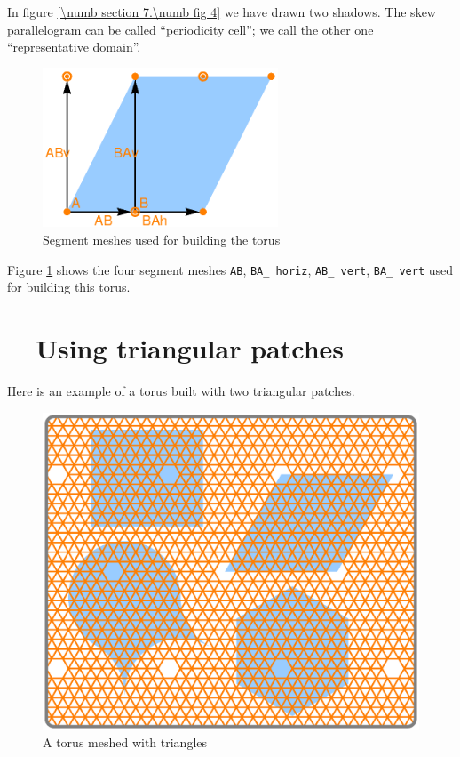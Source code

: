 In figure \ref{\numb section 7.\numb fig 4} we have drawn two shadows.
The skew parallelogram can be called ``periodicity cell'';
we call the other one ``representative domain''.

\begin{figure}[ht] \centering
  \includegraphics[width=70mm]{torus-sketch.eps}
  \caption{Segment meshes used for building the torus}
  \label{\numb section 7.\numb fig 5}
\end{figure}

Figure \ref{\numb section 7.\numb fig 5} shows the four segment meshes {\small\tt AB},
{\small\tt BA\_\,horiz}, {\small\tt AB\_\,vert}, {\small\tt BA\_\,vert} used for
building this torus.



\section{~~Using triangular patches}\label{\numb section 7.\numb parag 9}

Here is an example of a torus built with two triangular patches.

\begin{figure}[ht] \centering
  \includegraphics[width=130mm]{flat-torus-5.eps}
  \caption{A torus meshed with triangles}
  \label{\numb section 7.\numb fig 6}
\end{figure}


